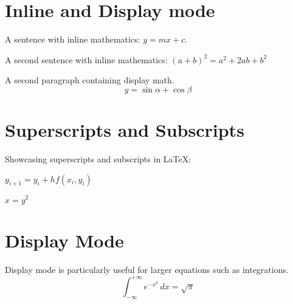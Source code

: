 \documentclass{article}
\begin{document}
\section{Inline and Display mode}
A sentence with inline mathematics: $y = mx + c$.

A second sentence with inline mathematics: $(a + b)^2 = a^2 + 2ab + b^2$



A second paragraph containing display math. 
\[
	y =\sin \alpha + \cos \beta
\]

\section{Superscripts and Subscripts}
Showcasing superscripts and subscripts in LaTeX:

$y_{i+1} = y_{i} + h f(x_{i}, y_{i})$

$x = y^{2}$

\section{Display Mode}
Display mode is particularly useful for larger equations such as integrations.
\begin{equation}
\int_{-\infty}^{+\infty} e^{-x^2}  \, dx = {\sqrt \pi}
\end{equation}
\end{document}
